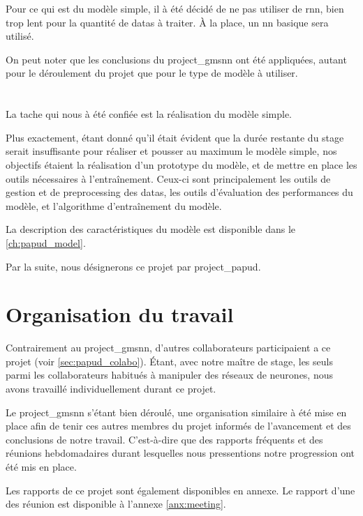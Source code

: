 Pour ce qui est du modèle simple, il à été décidé de ne pas utiliser de \gls{rnn}, bien trop lent pour la quantité de \glspl{data} à traiter. À la place, un \gls{nn} basique sera utilisé.

On peut noter que les conclusions du \gls{project_gmsnn} ont été appliquées, autant pour le déroulement du projet que pour le type de modèle à utiliser.


\section{}
La tache qui nous à été confiée est la réalisation du modèle simple.

Plus exactement, étant donné qu'il était évident que la durée restante du stage serait insuffisante pour réaliser et pousser au maximum le modèle simple, nos objectifs étaient la réalisation d'un prototype du modèle, et de mettre en place les outils nécessaires à l'entraînement.
Ceux-ci sont principalement les outils de gestion et de \gls{preprocessing} des \glspl{data}, les outils d'évaluation des performances du modèle, et l'algorithme d'entraînement du modèle.

La description des caractéristiques du modèle est disponible dans le \autoref{ch:papud_model}.

Par la suite, nous désignerons ce projet par \og \gls{project_papud}\fg{}.

\section{Organisation du travail}
Contrairement au \gls{project_gmsnn}, d'autres collaborateurs participaient a ce projet (voir \autoref{sec:papud_colabo}).
Étant, avec notre maître de stage, les seuls parmi les collaborateurs habitués à manipuler des réseaux de neurones, nous avons travaillé individuellement durant ce projet.

Le \gls{project_gmsnn} s'étant bien déroulé, une organisation similaire à été mise en place afin de tenir ces autres membres du projet informés de l'avancement et des conclusions de notre travail.
C'est-à-dire que des rapports fréquents et des réunions hebdomadaires durant lesquelles nous pressentions notre progression ont été mis en place.

Les rapports de ce projet sont également disponibles en annexe.
Le rapport d'une des réunion est disponible à l'annexe \ref{anx:meeting}. %

